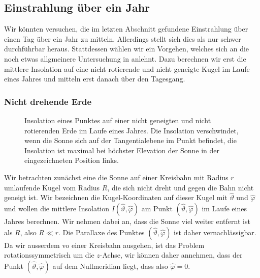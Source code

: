 %
%
%
\subsection{Einstrahlung über ein Jahr}
Wir könnten versuchen, die im letzten Abschnitt gefundene Einstrahlung
über einen Tag über ein Jahr zu mitteln.
Allerdings stellt sich dies als nur schwer durchführbar heraus.
Stattdessen wählen wir ein Vorgehen, welches  sich an die 
noch etwas allgmeinere Untersuchung in 
\cite[section 5]{skript:mcgeheelehman}
anlehnt.
Dazu berechnen wir erst die mittlere Insolation auf eine nicht
rotierende und nicht geneigte Kugel im Laufe eines Jahres und
mitteln erst danach über den Tagesgang.

\subsubsection{Nicht drehende Erde}
\begin{figure}%
\centering%
\caption{Insolation eines Punktes auf einer nicht geneigten 
und nicht rotierenden Erde im Laufe eines Jahres.
Die Insolation verschwindet, wenn die Sonne sich auf der Tangentialebene
im Punkt befindet, die Insolation ist maximal bei höchster Elevation
der Sonne in der eingezeichneten Position links.
\label{skript:insolation:fest}}
\end{figure}%
Wir betrachten zunächst eine die Sonne auf einer Kreisbahn mit Radius $r$
umlaufende Kugel vom Radius $R$, die sich nicht dreht und gegen die Bahn
nicht geneigt ist.
Wir bezeichnen die Kugel-Koordinaten auf dieser Kugel mit $\hat\vartheta$
und $\hat\varphi$ und wollen die mittlere Insolation
$I(\hat\vartheta,\hat\varphi)$ am Punkt $(\hat\vartheta,\hat\varphi)$
im Laufe eines Jahres berechnen.
Wir nehmen dabei an, dass die Sonne viel weiter entfernt ist als $R$,
also $R\ll r$.
Die Parallaxe des Punktes $(\hat\vartheta,\hat\varphi)$ ist daher
vernachlässigbar.
Da wir ausserdem vo einer Kreisbahn ausgehen, ist das Problem
rotationssymmetrisch um die $z$-Achse, wir können daher annehmen, dass
der Punkt $(\hat\vartheta,\hat\varphi)$ auf dem Nullmeridian liegt,
dass also $\hat\varphi=0$.


